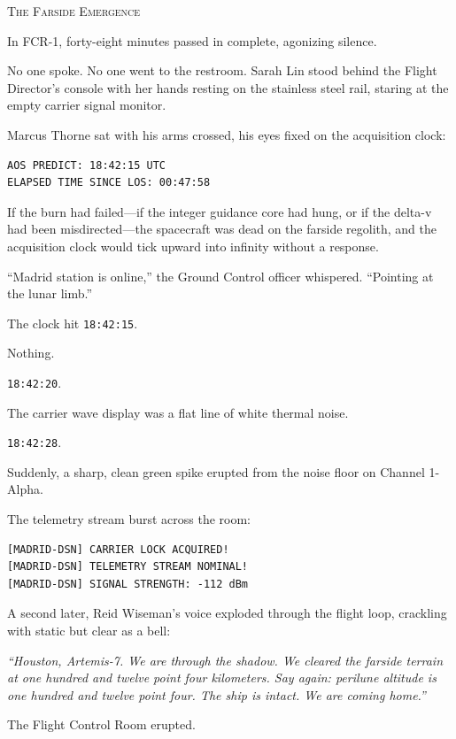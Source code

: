 \documentclass[12pt,twoside,openright]{book}
\newcommand{\sceneheader}[1]{%
  \par\vspace{1.8em}%
  {\noindent\centering\scshape\large #1\par}%
  \vspace{1.0em}%
  \noindent%
}
\newcommand{\dinkus}{%
  \par\vspace{1.2em}%
  {\noindent\centering{\large $\ast\quad\ast\quad\ast$}\par}%
  \vspace{1.2em}%
  \noindent%
}
\begin{document}
\dinkus

\sceneheader{The Farside Emergence}

In FCR-1, forty-eight minutes passed in complete, agonizing silence.

No one spoke. No one went to the restroom. Sarah Lin stood behind the
Flight Director's console with her hands resting on the stainless steel
rail, staring at the empty carrier signal monitor.

Marcus Thorne sat with his arms crossed, his eyes fixed on the
acquisition clock:

\begin{lstlisting}
AOS PREDICT: 18:42:15 UTC
ELAPSED TIME SINCE LOS: 00:47:58
\end{lstlisting}

If the burn had failed---if the integer guidance core had hung, or if
the delta-v had been misdirected---the spacecraft was dead on the
farside regolith, and the acquisition clock would tick upward into
infinity without a response.

``Madrid station is online,'' the Ground Control officer whispered.
``Pointing at the lunar limb.''

The clock hit \passthrough{\lstinline!18:42:15!}.

Nothing.

\passthrough{\lstinline!18:42:20!}.

The carrier wave display was a flat line of white thermal noise.

\passthrough{\lstinline!18:42:28!}.

Suddenly, a sharp, clean green spike erupted from the noise floor on
Channel 1-Alpha.

The telemetry stream burst across the room:

\begin{lstlisting}
[MADRID-DSN] CARRIER LOCK ACQUIRED!
[MADRID-DSN] TELEMETRY STREAM NOMINAL!
[MADRID-DSN] SIGNAL STRENGTH: -112 dBm
\end{lstlisting}

A second later, Reid Wiseman's voice exploded through the flight loop,
crackling with static but clear as a bell:

\emph{``Houston, Artemis-7. We are through the shadow. We cleared the
farside terrain at one hundred and twelve point four kilometers. Say
again: perilune altitude is one hundred and twelve point four. The ship
is intact. We are coming home.''}

The Flight Control Room erupted.
\end{document}
